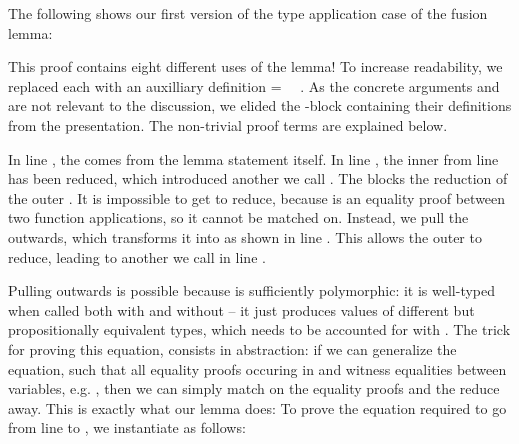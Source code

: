 \documentclass[acmsmall,anonymous,review,screen]{acmart}
\newenvironment{AgdaBlock}{%
  \vspace{\AgdaEmptySkip}%
  \AgdaNoSpaceAroundCode{}%
}{%
  \AgdaSpaceAroundCode{}
}
\begin{document}
The following shows our first version of the type application case
{} of the fusion lemma:

\begin{AgdaBlock}
  \SubstExamplesFusionESubESub
  \SubstExamplesFusionESubESubBody
\end{AgdaBlock}

This proof contains eight different uses of the {\Asubst} lemma!
To increase readability, we replaced each {\Asubst} 
with an auxilliary definition { = \Asubst~~}.
As the concrete arguments {} and {} are not relevant to the
discussion, we elided the -block containing their
definitions from the presentation. The non-trivial proof terms {} are explained below.

In line , the {} comes from the lemma statement itself.
In line , the inner {\AEsub} from line  has been reduced, which
introduced another {\Asubst} we call {}.
The {} blocks the reduction of the outer {\AEsub}.
It is impossible to get {} to reduce, because {} is
an equality proof between two function applications, so it cannot be
matched on.
Instead, we pull the {} outwards, which transforms it into
{} as shown in line . This allows the outer {\AEsub}
to reduce, leading to another {\Asubst} we call {} in line .

Pulling {} outwards is possible because {\AEsub} is sufficiently polymorphic:
it is well-typed when called both with and without {} -- it just produces values
of different but propositionally equivalent types, which needs to be accounted for with {}.
The trick for proving this equation, consists in abstraction:
if we can generalize the equation, such that all equality proofs occuring in {}
and  {} witness equalities between variables, e.g. , then
we can simply match on the equality proofs and the {} reduce away.
This is exactly what our {} lemma does:
\SubstExamplesDistSubst
To prove the equation required to go from line  to , we
instantiate {} as follows:
\SubstExamplesFusionESubESubBodyProofA

\end{document}
